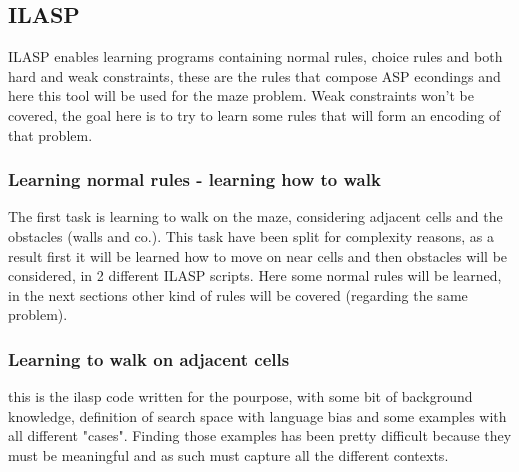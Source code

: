 \subsection{ILASP}

ILASP enables learning programs containing normal rules, choice rules and both hard and weak constraints, these are the rules that compose ASP econdings and here this tool will be used for the maze problem. Weak constraints won't be covered, the goal here is to try to learn some rules that will form an encoding of that problem.

\subsubsection{Learning normal rules - learning how to walk}

The first task is learning to walk on the maze, considering adjacent cells and the obstacles (walls and co.). This task have been split for complexity reasons, as a result first it will be learned how to move on near cells and then obstacles will be considered, in 2 different ILASP scripts. Here some normal rules will be learned, in the next sections other kind of rules will be covered (regarding the same problem).

\subsubsection{Learning to walk on adjacent cells}

this is the ilasp code written for the pourpose, with some bit of background knowledge, definition of search space with language bias and some examples with all different "cases".  Finding those examples has been pretty difficult because they must be meaningful and as such must capture all the different contexts.

